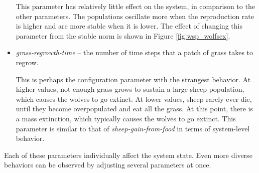 \begin{itemize}
This parameter has relatively little effect on the system, in comparison to the other parameters.
The populations oscillate more when the reproduction rate is higher and are more stable when it is lower.
The effect of changing this parameter from the stable norm is  shown in Figure \ref{fig:wsp_wolfsex}.

   \item \textit{grass-regrowth-time} -- the number of time steps that a patch of grass takes to regrow.

This is perhaps the configuration parameter with the strangest behavior.
At higher values, not enough grass grows to sustain a large sheep population, which causes the wolves to go extinct.
At lower values, sheep rarely ever die, until they become overpopulated and eat all the grass.
At this point, there is a mass extinction, which typically causes the wolves to go extinct.
This parameter is similar to that of \textit{sheep-gain-from-food} in terms of system-level behavior.

\end{itemize}
Each of these parameters individually affect the system state.
Even more diverse behaviors can be observed by adjusting several parameters at once.

